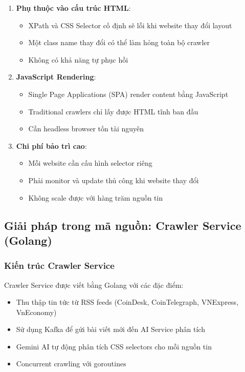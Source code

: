 \begin{enumerate}
    \item \textbf{Phụ thuộc vào cấu trúc HTML}:
    \begin{itemize}
        \item XPath và CSS Selector cố định sẽ lỗi khi website thay đổi layout
        \item Một class name thay đổi có thể làm hỏng toàn bộ crawler
        \item Không có khả năng tự phục hồi
    \end{itemize}
    
    \item \textbf{JavaScript Rendering}:
    \begin{itemize}
        \item Single Page Applications (SPA) render content bằng JavaScript
        \item Traditional crawlers chỉ lấy được HTML tĩnh ban đầu
        \item Cần headless browser tốn tài nguyên
    \end{itemize}
    
    \item \textbf{Chi phí bảo trì cao}:
    \begin{itemize}
        \item Mỗi website cần cấu hình selector riêng
        \item Phải monitor và update thủ công khi website thay đổi
        \item Không scale được với hàng trăm nguồn tin
    \end{itemize}
\end{enumerate}

\subsection{Giải pháp trong mã nguồn: Crawler Service (Golang)}

\subsubsection{Kiến trúc Crawler Service}

Crawler Service được viết bằng Golang với các đặc điểm:
\begin{itemize}
    \item Thu thập tin tức từ RSS feeds (CoinDesk, CoinTelegraph, VNExpress, VnEconomy)
    \item Sử dụng Kafka để gửi bài viết mới đến AI Service phân tích
    \item Gemini AI tự động phân tích CSS selectors cho mỗi nguồn tin
    \item Concurrent crawling với goroutines
\end{itemize}

